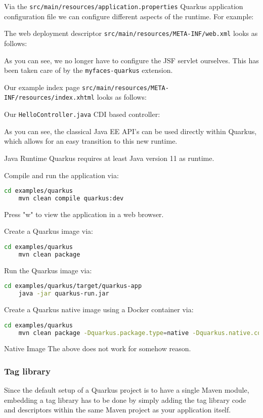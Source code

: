 Via the \texttt{src/main/resources/application.properties}  Quarkus application configuration file we can configure different aspects of the runtime. For example:


The web deployment descriptor \texttt{src/main/resources/META-INF/web.xml} looks as follows:

As you can see, we no longer have to configure the JSF servlet ourselves.
This has been taken care of by the \texttt{myfaces-quarkus} extension.

Our example index page \texttt{src/main/resources/META-INF/resources/index.xhtml} looks as follows:


Our \texttt{HelloController.java} CDI based controller:

As you can see, the classical Java EE API's can be used directly within Quarkus, which allows for an easy transition to this new runtime.

\begin{TIP}{Java Runtime}
	Quarkus requires at least Java version 11 as runtime.
\end{TIP}

Compile and run the application via:
\begin{lstlisting}[language=bash]
	cd examples/quarkus
	mvn clean compile quarkus:dev
\end{lstlisting}
Press "w" to view the application in a web browser.

Create a Quarkus image via:
\begin{lstlisting}[language=bash]
	cd examples/quarkus
	mvn clean package
\end{lstlisting}
Run the Quarkus image via:
\begin{lstlisting}[language=bash]
	cd examples/quarkus/target/quarkus-app
	java -jar quarkus-run.jar
\end{lstlisting}
Create a Quarkus native image using a Docker container via:
\begin{lstlisting}[language=bash]
	cd examples/quarkus
	mvn clean package -Dquarkus.package.type=native -Dquarkus.native.container-build=true
\end{lstlisting}
\begin{TODO}{Native Image}
The above does not work for somehow reason.
\end{TODO}

\subsubsection{Tag library}
Since the default setup of a Quarkus project is to have a single Maven module,
embedding a tag library has to be done by simply adding the tag library code and descriptors within the same Maven project as your application itself.


